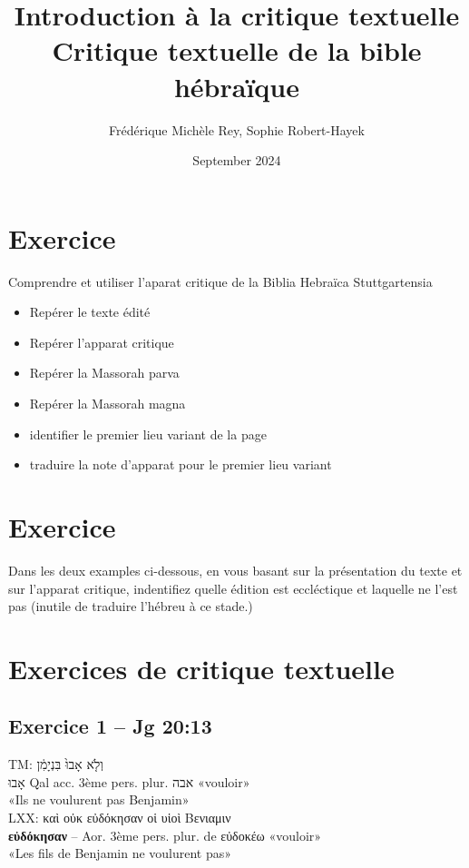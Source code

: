 \documentclass[11pt,a4paper]{article}
\title{Introduction à la critique textuelle\\Critique textuelle de la bible hébraïque}
\author{Frédérique Michèle Rey, Sophie Robert-Hayek}
\date{September 2024}
\begin{document}
\maketitle
\justifying

\section{Exercice}
Comprendre et utiliser l'aparat critique de la Biblia Hebraïca Stuttgartensia
\begin{itemize}
    \item Repérer le texte édité
    \item Repérer l'apparat critique
    \item Repérer la Massorah parva
    \item Repérer la Massorah magna
    \item identifier le premier lieu variant de la page
    \item traduire la note d'apparat pour le premier lieu variant
\end{itemize}
\section{Exercice}
Dans les deux examples ci-dessous, en vous basant sur la présentation du texte et sur l'apparat critique, indentifiez quelle édition est eccléctique et laquelle ne l'est pas (inutile de traduire l'hébreu à ce stade.)



\section*{Exercices de critique textuelle}

\subsection*{Exercice 1 – Jg 20:13}
TM: \texthebrew{וְלֹ֤א אָבוּ֙ בִּנְיָמִ֔ן} \\
\texthebrew{אָבוּ} Qal acc. 3ème pers. plur. \texthebrew{אבה} «vouloir» \\
«Ils ne voulurent pas Benjamin» \\
LXX: \textgreek{καὶ οὐκ εὐδόκησαν οἱ υἱοὶ Βενιαμιν} \\
\textbf{εὐδόκησαν} – Aor. 3ème pers. plur. de \textgreek{εὐδοκέω} «vouloir» \\
«Les fils de Benjamin ne voulurent pas»
\end{document}
